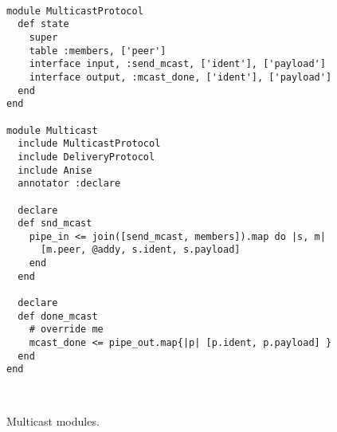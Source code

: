 \begin{figure}[t]
\begin{scriptsize}
\begin{lstlisting}

module MulticastProtocol
  def state
    super
    table :members, ['peer']
    interface input, :send_mcast, ['ident'], ['payload']
    interface output, :mcast_done, ['ident'], ['payload']
  end
end

module Multicast
  include MulticastProtocol
  include DeliveryProtocol
  include Anise
  annotator :declare

  declare
  def snd_mcast
    pipe_in <= join([send_mcast, members]).map do |s, m|
      [m.peer, @addy, s.ident, s.payload]
    end
  end

  declare
  def done_mcast
    # override me
    mcast_done <= pipe_out.map{|p| [p.ident, p.payload] }
  end
end



\end{lstlisting}
\centering
\vspace{-10pt}
\caption{Multicast modules.}
\label{fig:kvs-impl}
\end{scriptsize}
\vspace{-2pt}
\end{figure}
